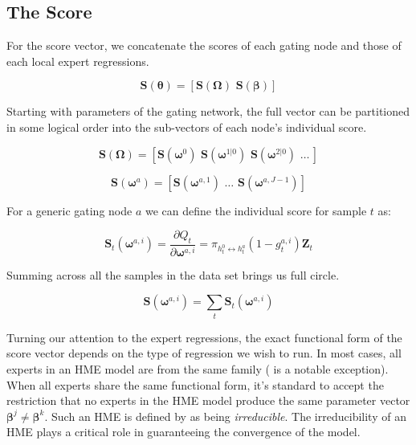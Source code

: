 \documentclass[12pt]{article}
\newcommand{\gateprod}[2]{\pi_{#1 \longleftrightarrow #2}}
\begin{document}
\subsection{The Score}

For the score vector, we concatenate the scores of each gating node and those of each
local expert regressions.

\begin{equation}
  \boldsymbol{S}(\boldsymbol{\theta}) = [ \boldsymbol{S}(\boldsymbol{\Omega}) \,\, \boldsymbol{S}(\boldsymbol{\beta}) ]
\end{equation}

Starting with parameters of the gating network, the full vector can be partitioned 
in some logical order into the sub-vectors of each node's individual
score.

\begin{equation}
  \boldsymbol{S}(\boldsymbol{\Omega}) = [ \boldsymbol{S}(\boldsymbol{\omega}^{0}) \,\, \boldsymbol{S}(\boldsymbol{\omega}^{1 | 0}) \,\, \boldsymbol{S}(\boldsymbol{\omega}^{2 | 0}) \,\, \ldots \, ]
\end{equation}

\begin{equation}
  \boldsymbol{S}(\boldsymbol{\omega}^{a}) = [ \boldsymbol{S}(\boldsymbol{\omega}^{a, 1}) \,\, \ldots \,\, \boldsymbol{S}(\boldsymbol{\omega}^{a, J - 1}) ]
\end{equation}

For a generic gating node $a$ we can define the individual score for 
sample $t$ as:

\begin{equation} \label{eq:gateScore}
  \boldsymbol{S}_{t}(\boldsymbol{\omega}^{a, i}) = \frac{\partial Q_{t}}{\partial \boldsymbol{\omega}^{a,i}} = \gateprod{h^{0}_{t}}{h^{a}_{t}} (1 - g^{a, i}_{t}) \boldsymbol{Z}_{t} 
\end{equation}


Summing across all the samples in the data set brings us full circle.

\begin{equation}
  \boldsymbol{S}(\boldsymbol{\omega}^{a, i}) = \sum_{t} \boldsymbol{S}_{t}(\boldsymbol{\omega}^{a, i})
\end{equation}


Turning our attention to the expert regressions, the exact functional form
of the score vector depends on the type of regression we wish to run. In most
cases, all experts in an HME model are from the same family
(\cite{HuertaJiangTanner2003} is a notable exception). When all experts share
the same functional form, it's standard to accept the restriction that no experts
in the HME model produce the same parameter vector
$\boldsymbol{\beta}^{j} \neq \boldsymbol{\beta}^{k}$. Such an HME is defined by
\cite{JiangTanner2000} as being \textit{irreducible}. The irreducibility of an HME
plays a critical role in guaranteeing the convergence of the model.
\end{document}
